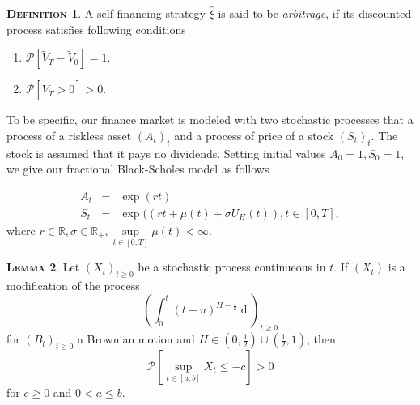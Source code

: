 \documentclass[a4paper, twoside, 11pt]{article}
\theoremstyle{definition}
\newtheorem{definition}{\scshape Definition}[section]
\newtheorem{lemma}[definition]{\scshape Lemma}
\newcommand{\brkt}[1]{\left({#1} \right)}
\begin{document}
\begin{definition}
  A self-financing strategy $\hat{\xi}$ is said to be \emph{arbitrage}, if its discounted process satisfies following conditions
  \begin{enumerate}[topsep=0pt, itemsep=-1ex, partopsep=1ex, parsep=1ex, label=(\roman*)]
	\item $\mathcal{P}[\tilde{V}_T - \tilde{V}_0]=1$.
	\item $\mathcal{P}[\tilde{V}_T > 0] > 0$.
	\end{enumerate}
  \end{definition}
To be specific, our finance market is modeled with two stochastic processes that a process of a riskless asset $(A_t)_t$ and a process of price of a stock $(S_t)_t$.  The stock is assumed that it pays no dividends. Setting initial values $A_0=1, S_0=1$, we give our fractional Black-Scholes model as follows

\begin{eqnarray}
  A_t &=& \exp(rt)\nonumber\\
  S_t &=& \exp((rt + \mu(t) +\sigma U_H(t)), t\in [0, T],
  \label{sec:fbs2}
\end{eqnarray}
where  $r\in\mathbb{R}, \sigma\in\mathbb{R}_+, \sup\limits_{t\in[0, T]}\mu(t) < \infty$.

\begin{lemma}
  Let $(X_t)_{t\ge 0}$ be a stochastic process continueous in $t$. If $(X_t)$ is a modification of the process 
  $$
  \brkt{\int_0^t (t-u)^{H-\frac{1}{2}}\mathop{dB_u}}_{t\ge 0}
  $$
  for $(B_t)_{t\ge 0}$ a Brownian motion and $H\in (0, \frac{1}{2})\cup(\frac{1}{2}, 1)$,
  then 
  $$
  \mathcal{P}[\sup\limits_{t\in[a,b]} X_t \le -c] > 0
  $$
  for $c \ge 0$ and $0< a\le b$.
  \label{sec:lll} 
\end{lemma}
\end{document}
